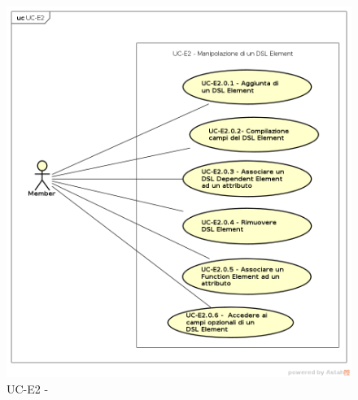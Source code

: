     \begin{figure}[H]
      \begin{center}
        \includegraphics[width=12cm]{res/img/UCEditor/UC-E2.png}
      \caption{UC-E2 - }
      \end{center} 
    \end{figure}    
    
